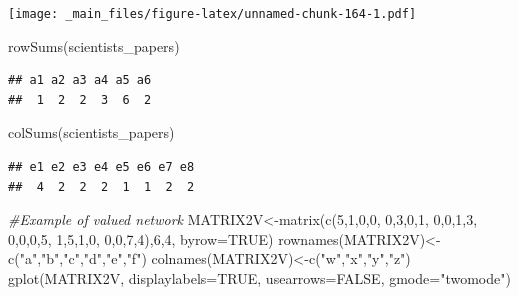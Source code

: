 \documentclass[
  notitlepage,
  onecolumn,
  openany]{book}
\newenvironment{Shaded}{\begin{snugshade}}{\end{snugshade}}
\newcommand{\AttributeTok}[1]{\textcolor[rgb]{0.77,0.63,0.00}{#1}}
\newcommand{\CommentTok}[1]{\textcolor[rgb]{0.56,0.35,0.01}{\textit{#1}}}
\newcommand{\ConstantTok}[1]{\textcolor[rgb]{0.00,0.00,0.00}{#1}}
\newcommand{\DecValTok}[1]{\textcolor[rgb]{0.00,0.00,0.81}{#1}}
\newcommand{\FunctionTok}[1]{\textcolor[rgb]{0.00,0.00,0.00}{#1}}
\newcommand{\NormalTok}[1]{#1}
\newcommand{\OtherTok}[1]{\textcolor[rgb]{0.56,0.35,0.01}{#1}}
\newcommand{\StringTok}[1]{\textcolor[rgb]{0.31,0.60,0.02}{#1}}
\begin{document}
\texttt{[image: \_main\_files/figure-latex/unnamed-chunk-164-1.pdf]}

\begin{Shaded}
\begin{Highlighting}[]
\FunctionTok{rowSums}\NormalTok{(scientists\_papers)}
\end{Highlighting}
\end{Shaded}

\begin{verbatim}
## a1 a2 a3 a4 a5 a6 
##  1  2  2  3  6  2
\end{verbatim}

\begin{Shaded}
\begin{Highlighting}[]
\FunctionTok{colSums}\NormalTok{(scientists\_papers)}
\end{Highlighting}
\end{Shaded}

\begin{verbatim}
## e1 e2 e3 e4 e5 e6 e7 e8 
##  4  2  2  2  1  1  2  2
\end{verbatim}

\begin{Shaded}
\begin{Highlighting}[]
\CommentTok{\#Example of valued network}
\NormalTok{MATRIX2V}\OtherTok{\textless{}{-}}\FunctionTok{matrix}\NormalTok{(}\FunctionTok{c}\NormalTok{(}\DecValTok{5}\NormalTok{,}\DecValTok{1}\NormalTok{,}\DecValTok{0}\NormalTok{,}\DecValTok{0}\NormalTok{,}
                   \DecValTok{0}\NormalTok{,}\DecValTok{3}\NormalTok{,}\DecValTok{0}\NormalTok{,}\DecValTok{1}\NormalTok{,}
                   \DecValTok{0}\NormalTok{,}\DecValTok{0}\NormalTok{,}\DecValTok{1}\NormalTok{,}\DecValTok{3}\NormalTok{,}
                   \DecValTok{0}\NormalTok{,}\DecValTok{0}\NormalTok{,}\DecValTok{0}\NormalTok{,}\DecValTok{5}\NormalTok{,}
                   \DecValTok{1}\NormalTok{,}\DecValTok{5}\NormalTok{,}\DecValTok{1}\NormalTok{,}\DecValTok{0}\NormalTok{,}
                   \DecValTok{0}\NormalTok{,}\DecValTok{0}\NormalTok{,}\DecValTok{7}\NormalTok{,}\DecValTok{4}\NormalTok{),}\DecValTok{6}\NormalTok{,}\DecValTok{4}\NormalTok{, }\AttributeTok{byrow=}\ConstantTok{TRUE}\NormalTok{)}
\FunctionTok{rownames}\NormalTok{(MATRIX2V)}\OtherTok{\textless{}{-}}\FunctionTok{c}\NormalTok{(}\StringTok{"a"}\NormalTok{,}\StringTok{"b"}\NormalTok{,}\StringTok{"c"}\NormalTok{,}\StringTok{"d"}\NormalTok{,}\StringTok{"e"}\NormalTok{,}\StringTok{"f"}\NormalTok{)}
\FunctionTok{colnames}\NormalTok{(MATRIX2V)}\OtherTok{\textless{}{-}}\FunctionTok{c}\NormalTok{(}\StringTok{"w"}\NormalTok{,}\StringTok{"x"}\NormalTok{,}\StringTok{"y"}\NormalTok{,}\StringTok{"z"}\NormalTok{)}
\FunctionTok{gplot}\NormalTok{(MATRIX2V, }\AttributeTok{displaylabels=}\ConstantTok{TRUE}\NormalTok{, }
      \AttributeTok{usearrows=}\ConstantTok{FALSE}\NormalTok{, }\AttributeTok{gmode=}\StringTok{"twomode"}\NormalTok{)}
\end{Highlighting}
\end{Shaded}
\end{document}
